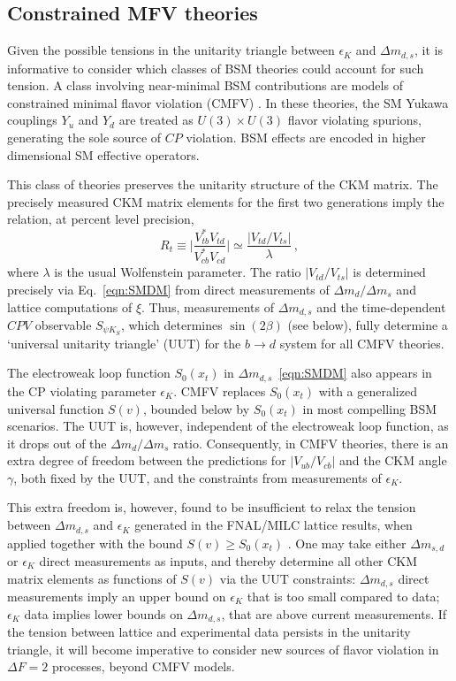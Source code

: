 \subsection{Constrained MFV theories}
Given the possible tensions in the unitarity triangle between $\epsilon_K$ and $\Delta m_{d,s}$, it is informative to consider which classes of BSM theories could account for such tension. A class involving near-minimal BSM contributions are models of constrained minimal flavor violation (CMFV) \cite{Buras:2000dm,Buras:2003jf,Blanke:2006ig,Blanke:2006yh,Blanke:2016bhf}. In these theories, the SM Yukawa couplings $Y_u$ and $Y_d$ are treated as $U(3)\times U(3)$ flavor violating spurions, generating the sole source of $CP$ violation.  BSM effects are encoded in higher dimensional SM effective operators.

This class of theories preserves the unitarity structure of the CKM matrix. The precisely measured CKM matrix elements for the first two generations imply the relation, at percent level precision,
\begin{equation}
	R_t \equiv \bigg|\frac{V_{tb}^*V_{td}}{V_{cb}^*V_{cd}}\bigg| \simeq \frac{|V_{td}/V_{ts}|}{\lambda}\,,
\end{equation}
where $\lambda$ is the usual Wolfenstein parameter. The ratio $|V_{td}/V_{ts}|$ is determined precisely via Eq.~\eqref{eqn:SMDM} from direct measurements of $\Delta m_d/ \Delta m_s$ and lattice computations of $\xi$. Thus, measurements of $\Delta m_{d,s}$ and the time-dependent $CPV$ observable $S_{\psi K_S}$, which determines $\sin(2\beta)$ (see below), fully determine a `universal unitarity triangle' (UUT) for the $b \to d$ system for all CMFV theories. 

The electroweak loop function $S_0(x_t)$ in $\Delta m_{d,s}$~\eqref{eqn:SMDM} also appears in the CP violating parameter $\epsilon_K$. CMFV replaces $S_0(x_t)$ with a generalized universal function $S(v)$, bounded below by $S_0(x_t)$ in most compelling BSM scenarios. The UUT is, however, independent of the electroweak loop function, as it drops out of the $\Delta m_{d}/\Delta m_s$ ratio. Consequently, in CMFV theories, there is an extra degree of freedom between the predictions for $|V_{ub}/V_{cb}|$ and the CKM angle $\gamma$, both fixed by the UUT, and the constraints from measurements of $\epsilon_K$. 

This extra freedom is, however, found to be insufficient to relax the tension between $\Delta m_{d,s}$ and $\epsilon_K$ generated in the FNAL/MILC lattice results, when applied together with the bound $S(v) \ge S_0(x_t)$ \cite{Blanke:2016bhf, Blanke:2016xvd}. One may take either $\Delta m_{s,d}$ or $\epsilon_K$ direct measurements as inputs, and thereby determine all other CKM matrix elements as functions of $S(v)$ via the UUT constraints: $\Delta m_{d,s}$ direct measurements imply an upper bound on $\epsilon_K$ that is too small compared to data; $\epsilon_K$ data implies lower bounds on $\Delta m_{d,s}$, that are above current measurements. If the tension between lattice and experimental data persists in the unitarity triangle, it will become imperative to consider new sources of flavor violation in $\Delta F = 2$ processes, beyond CMFV models.

